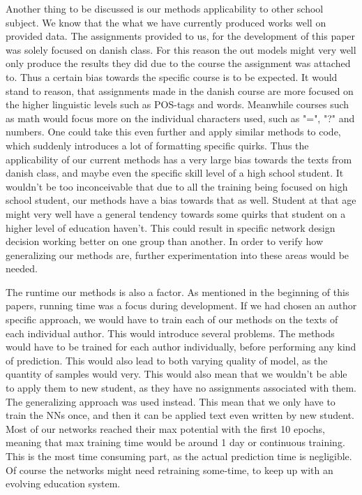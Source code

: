 Another thing to be discussed is our methods applicability to other school
subject. We know that the what we have currently produced works well on provided
data. The assignments provided to us, for the development of this paper was
solely focused on danish class. For this reason the out models might very well
only produce the results they did due to the course the assignment was attached
to. Thus a certain bias towards the specific course is to be expected. It would
stand to reason, that assignments made in the danish course are more focused
on the higher linguistic levels such as POS-tags and words. Meanwhile courses
such as math would focus more on the individual characters used, such as "=",
"?" and numbers. One could take this even further and apply similar methods
to code, which suddenly introduces a lot of formatting specific quirks. Thus
the applicability of our current methods has a very large bias towards the
texts from danish class, and maybe even the specific skill level of a high
school student. It wouldn't be too inconceivable that due to all the training
being focused on high school student, our methods have a bias towards that as
well. Student at that age might very well have a general tendency towards some
quirks that student on a higher level of education haven't. This could result in
specific network design decision working better on one group than another. In
order to verify how generalizing our methods are, further experimentation into
these areas would be needed.

The runtime our methods is also a factor. As mentioned in the beginning of
this papers, running time was a focus during development. If we had chosen an
author specific approach, we would have to train each of our methods on the texts
of each individual author. This would introduce several problems. The methods
would have to be trained for each author individually, before performing any
kind of prediction. This would also lead to both varying quality of model, as
the quantity of samples would very. This would also mean that we wouldn't be
able to apply them to new student, as they have no assignments associated with
them. The generalizing approach was used instead. This mean that we only have
to train the \gls{NN}s once, and then it can be applied text even written by
new student. Most of our networks reached their max potential with the first
10 epochs, meaning that max training time would be around 1 day or continuous
training. This is the most time consuming part, as the actual prediction time is
negligible. Of course the networks might need retraining some-time, to keep up
with an evolving education system.

